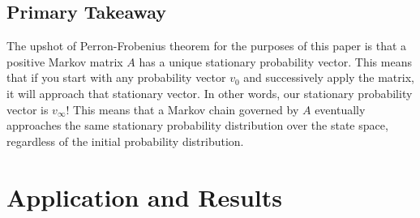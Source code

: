 \documentclass[10pt]{article}
\begin{document}
\subsection{Primary Takeaway}
The upshot of Perron-Frobenius theorem for the purposes of this paper is that a positive Markov matrix $A$ has a unique stationary probability vector. This means that if you start with any probability vector $v_0$ and successively apply the matrix, it will approach that stationary vector. In other words, our stationary probability vector is $v_\infty$! This means that a Markov chain governed by $A$ eventually approaches the same stationary probability distribution over the state space, regardless of the initial probability distribution.
\newpage
\section{Application and Results}
\end{document}
